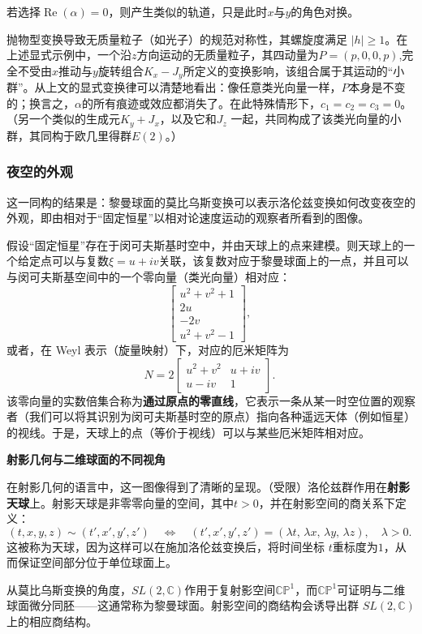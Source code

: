 若选择$\operatorname{Re}(\alpha) = 0$，则产生类似的轨道，只是此时$x$与$y$的角色对换。

抛物型变换导致无质量粒子（如光子）的规范对称性，其螺旋度满足 $|h|\geq 1$。在上述显式示例中，一个沿$z$方向运动的无质量粒子，其四动量为$P = (p, 0, 0, p)$,完全不受由$x$推动与$y$旋转组合$K_{x} - J_{y}$所定义的变换影响，该组合属于其运动的“小群”。从上文的显式变换律可以清楚地看出：像任意类光向量一样，$P$本身是不变的；换言之，$\alpha$的所有痕迹或效应都消失了。在此特殊情形下，$c_{1} = c_{2} = c_{3} = 0$。（另一个类似的生成元$K_{y} + J_{x}$，以及它和$J_{z}$ 一起，共同构成了该类光向量的小群，其同构于欧几里得群$E(2)$。）
\subsubsection{夜空的外观}
这一同构的结果是：黎曼球面的莫比乌斯变换可以表示洛伦兹变换如何改变夜空的外观，即由相对于“固定恒星”以相对论速度运动的观察者所看到的图像。

假设“固定恒星”存在于闵可夫斯基时空中，并由天球上的点来建模。则天球上的一个给定点可以与复数$\xi = u + iv$关联，该复数对应于黎曼球面上的一点，并且可以与闵可夫斯基空间中的一个零向量（类光向量）相对应：
\[
\begin{bmatrix}
u^{2} + v^{2} + 1 \\
2u \\
-2v \\
u^{2} + v^{2} - 1
\end{bmatrix},~
\]
或者，在 Weyl 表示（旋量映射）下，对应的厄米矩阵为
\[
N = 2
\begin{bmatrix}
u^{2} + v^{2} & u + iv \\
u - iv & 1
\end{bmatrix}.~
\]
该零向量的实数倍集合称为\textbf{通过原点的零直线}，它表示一条从某一时空位置的观察者（我们可以将其识别为闵可夫斯基时空的原点）指向各种遥远天体（例如恒星）的视线。于是，天球上的点（等价于视线）可以与某些厄米矩阵相对应。

\textbf{射影几何与二维球面的不同视角}

在射影几何的语言中，这一图像得到了清晰的呈现。（受限）洛伦兹群作用在\textbf{射影天球}上。射影天球是非零零向量的空间，其中$t > 0$，并在射影空间的商关系下定义：
\[
(t,x,y,z) \sim (t',x',y',z')
\quad\Longleftrightarrow\quad
(t',x',y',z') = (\lambda t,\, \lambda x,\, \lambda y,\, \lambda z), \quad \lambda > 0.~
\]
这被称为天球，因为这样可以在施加洛伦兹变换后，将时间坐标 $t$重标度为$1$，从而保证空间部分位于单位球面上。

从莫比乌斯变换的角度，$SL(2,\mathbb{C})$作用于复射影空间$\mathbb{CP}^{1}$，而$\mathbb{CP}^{1}$可证明与二维球面微分同胚——这通常称为黎曼球面。射影空间的商结构会诱导出群 $SL(2,\mathbb{C})$上的相应商结构。

